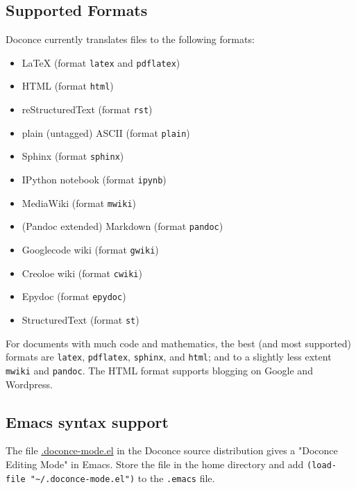 \documentclass[%
oneside,                 %
final,                   %
10pt]{article}
\begin{document}
\subsection{Supported Formats}

Doconce currently translates files to the following formats:

\begin{itemize}
 \item {\LaTeX} (format \Verb!latex! and \Verb!pdflatex!)

 \item HTML (format \Verb!html!)

 \item reStructuredText (format \Verb!rst!)

 \item plain (untagged) ASCII (format \Verb!plain!)

 \item Sphinx (format \Verb!sphinx!)

 \item IPython notebook (format \Verb!ipynb!)

 \item MediaWiki (format \Verb!mwiki!)

 \item (Pandoc extended) Markdown (format \Verb!pandoc!)

 \item Googlecode wiki (format \Verb!gwiki!)

 \item Creoloe wiki (format \Verb!cwiki!)

 \item Epydoc (format \Verb!epydoc!)

 \item StructuredText (format \Verb!st!)
\end{itemize}

\noindent
For documents with much code and mathematics, the best (and most supported)
formats are \Verb!latex!, \Verb!pdflatex!, \Verb!sphinx!, and \Verb!html!; and to a slightly
less extent \Verb!mwiki! and \Verb!pandoc!. The HTML format supports blogging on
Google and Wordpress.


\subsection{Emacs syntax support}

The file \href{{https://doconce.googlecode.com/hg/misc/.doconce-mode.el}}{.doconce-mode.el} in the Doconce source distribution
gives a "Doconce Editing Mode" in Emacs. Store the file in the home
directory and add \Verb!(load-file "~/.doconce-mode.el")! to the \Verb!.emacs!
file.
\end{document}
